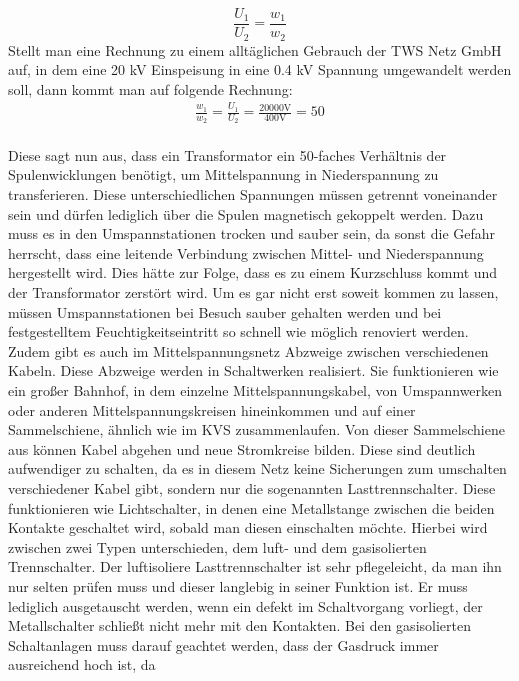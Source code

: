 \begin{equation}
\frac{U_1}{U_2}=\frac{w_1}{w_2}
\label{eqn:Transformator Wicklungszahl}
\end{equation}
Stellt man eine Rechnung zu einem alltäglichen Gebrauch der TWS Netz GmbH auf, in dem eine 20 kV Einspeisung in eine 0.4 kV Spannung umgewandelt werden 
soll, dann kommt man auf folgende Rechnung:
\begin{eqnarray}
\frac{w_1}{w_2}=\frac{U_1}{U_2}=\frac{20000\text{V}}{400\text{V}}=50
\label{eqn:Beispiel Wicklungen}
\end{eqnarray}
\\
Diese sagt nun aus, dass ein Transformator ein 50-faches Verhältnis der Spulenwicklungen benötigt, um Mittelspannung in Niederspannung zu transferieren. Diese 
unterschiedlichen Spannungen müssen getrennt voneinander sein und dürfen lediglich über die Spulen magnetisch gekoppelt werden. Dazu muss es in den 
Umspannstationen trocken und sauber sein, da sonst die Gefahr herrscht, dass eine leitende Verbindung zwischen Mittel- und Niederspannung hergestellt wird. 
Dies hätte zur Folge, dass es zu einem Kurzschluss kommt und der Transformator zerstört wird. Um es gar nicht erst soweit kommen zu lassen, müssen Umspannstationen 
bei Besuch sauber gehalten werden und bei festgestelltem Feuchtigkeitseintritt so schnell wie möglich renoviert werden. \autocite{Weigerber.2013} 
\\
Zudem gibt es auch im Mittelspannungsnetz Abzweige zwischen verschiedenen Kabeln. Diese Abzweige werden in Schaltwerken realisiert. Sie funktionieren wie ein 
großer Bahnhof, in dem einzelne Mittelspannungskabel, von \zB Umspannwerken oder anderen Mittelspannungskreisen hineinkommen und auf einer Sammelschiene, 
ähnlich wie im KVS zusammenlaufen. Von dieser Sammelschiene aus können Kabel abgehen und neue Stromkreise bilden. Diese sind deutlich aufwendiger zu schalten, 
da es in diesem Netz keine Sicherungen zum umschalten verschiedener Kabel gibt, sondern nur die sogenannten Lasttrennschalter. Diese funktionieren wie 
Lichtschalter, in denen  eine Metallstange zwischen die beiden Kontakte geschaltet wird, sobald man diesen einschalten möchte. Hierbei wird zwischen zwei 
Typen unterschieden, dem luft- und dem gasisolierten Trennschalter. 
Der luftisoliere Lasttrennschalter ist sehr pflegeleicht, da man ihn nur selten prüfen 
muss und dieser langlebig in seiner Funktion ist. Er muss lediglich ausgetauscht werden, wenn ein defekt im Schaltvorgang vorliegt, \zB der Metallschalter 
schließt nicht mehr mit den Kontakten. Bei den gasisolierten Schaltanlagen muss darauf geachtet werden, dass der Gasdruck immer ausreichend hoch ist, da 
